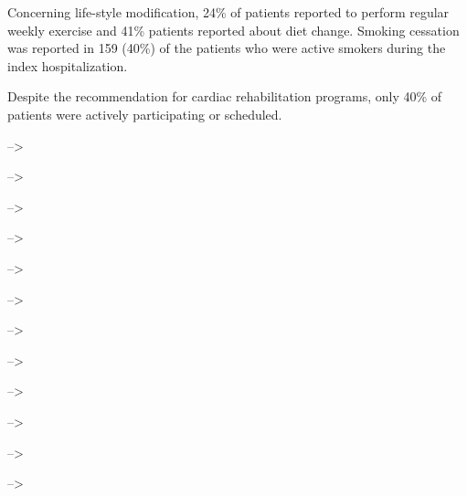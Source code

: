 \documentclass[
]{article}
\begin{document}
Concerning life-style modification, 24\% of patients reported to perform
regular weekly exercise and 41\% patients reported about diet change.
Smoking cessation was reported in 159 (40\%) of the patients who were
active smokers during the index hospitalization.

Despite the recommendation for cardiac rehabilitation programs, only
40\% of patients were actively participating or scheduled. \pagebreak

--\textgreater{}

--\textgreater{}

--\textgreater{}

--\textgreater{}

--\textgreater{}

--\textgreater{}

--\textgreater{}

--\textgreater{}

--\textgreater{}

--\textgreater{}

--\textgreater{}

--\textgreater{}
\end{document}
